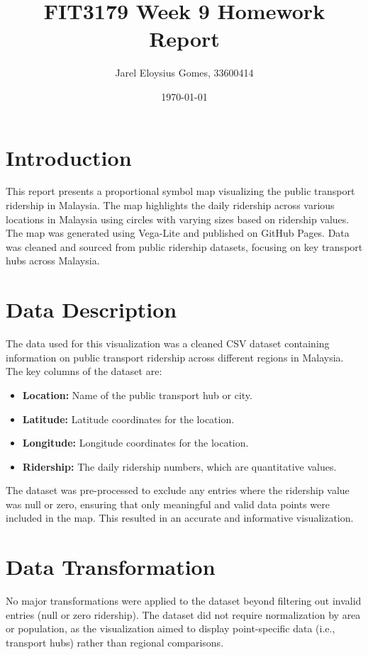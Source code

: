 \documentclass{article}
\title{FIT3179 Week 9 Homework Report}
\author{Jarel Eloysius Gomes, 33600414}
\date{\today}
\begin{document}
\maketitle

\section*{Introduction}
This report presents a proportional symbol map visualizing the public transport ridership in Malaysia. The map highlights the daily ridership across various locations in Malaysia using circles with varying sizes based on ridership values. The map was generated using Vega-Lite and published on GitHub Pages. Data was cleaned and sourced from public ridership datasets, focusing on key transport hubs across Malaysia.

\section*{Data Description}
The data used for this visualization was a cleaned CSV dataset containing information on public transport ridership across different regions in Malaysia. The key columns of the dataset are:
\begin{itemize}
    \item \textbf{Location:} Name of the public transport hub or city.
    \item \textbf{Latitude:} Latitude coordinates for the location.
    \item \textbf{Longitude:} Longitude coordinates for the location.
    \item \textbf{Ridership:} The daily ridership numbers, which are quantitative values.
\end{itemize}

The dataset was pre-processed to exclude any entries where the ridership value was null or zero, ensuring that only meaningful and valid data points were included in the map. This resulted in an accurate and informative visualization.

\section*{Data Transformation}
No major transformations were applied to the dataset beyond filtering out invalid entries (null or zero ridership). The dataset did not require normalization by area or population, as the visualization aimed to display point-specific data (i.e., transport hubs) rather than regional comparisons.
\end{document}
